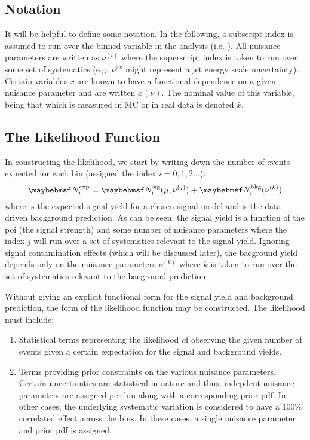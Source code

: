 \subsection{Notation}
It will be helpful to define some notation. In the following, a subscript index
is assumed to run over the binned variable in the analysis
(i.e. \STlep). All nuisance parameters are written as $\nu^{(i)}$ where the
superscript index is taken to run over some set of systematics
(e.g. $\nu^{\textrm{jes}}$ might represent a jet energy scale
uncertainty). Certain variables $x$ are known to have a functional dependence on a
given nuisance parameter and are written $x(\nu)$. The nominal value of this
variable, being that which is measured in \ac{MC} or in real data is denoted
$\bar{x}$.

\subsection{The Likelihood Function}
In constructing the likelihood, we start by writing down the number of events
expected for each bin (assigned the index $i=0,1,2...$):
\begin{equation}
\NExpi = \NSigi(\mu, \nu^{(j)}) +
\NBkgi(\nu^{(k)}) \\
\end{equation}
where \NSigi is the expected signal yield for a chosen
signal model and \NBkgi is the data-driven background
prediction. As can be seen, the signal yield is a function of the \ac{poi} (the
signal strength) and some number of nuisance parameters where the index $j$
will run over a set of systematics relevant to the signal yield. Ignoring
signal contamination effects (which will be discussed later), the bacground
yield depends only on the nuisance parameters $\nu^{(k)}$ where $k$ is taken to run
over the set of systematics relevant to the bacground prediction.

Without giving an explicit functional form for the signal yield and background
prediction, the form of the likelihood function may be constructed. The
likelihood must include:
\begin{enumerate}
\item Statistical terms representing the likelihood of observing the given
  number of events given a certain expectation for the signal and background
  yields.
\item Terms providing prior constraints on the various nuisance
  parameters. Certain uncertainties are statistical in nature and thus,
  indepdent nuisance parameters are assigned per bin along with a corresponding
  prior pdf. In other cases, the underlying systematic variation is considered
  to have a 100\% correlated effect across the bins. In these cases, a single
  nuisance parameter and prior pdf is assigned.
\end{enumerate}

